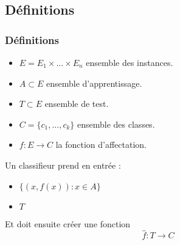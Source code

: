  \subsection{Définitions}
  \begin{frame}
   \frametitle{Définitions}
  \begin{itemize}
   \item $E = E_1 \times ... \times E_n$ ensemble des instances.
   \item $A \subset E$ ensemble d'apprentissage.
   \item $T \subset E$ ensemble de test.
   \item $C = \{c_1, ..., c_k\}$ ensemble des classes.
   \item $f : E \longrightarrow C$ la fonction d'affectation.\\
  \end{itemize}

Un classifieur prend en entrée : 
\begin{itemize}
 \item $\{(x, f(x)) : x \in A\}$
 \item $T$ 
\end{itemize}

Et doit ensuite créer une fonction
$$\hat{f} : T \longrightarrow C$$ 

  

  \end{frame}



